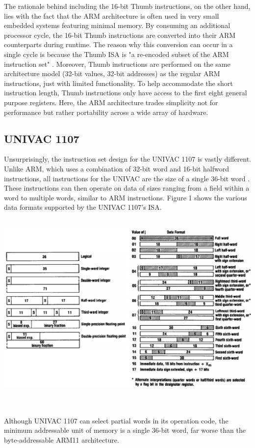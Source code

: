 \documentclass[onecolumn, draftclsnofoot, 10pt, compsoc]{IEEEtran}
\begin{document}
The rationale behind including the 16-bit Thumb instructions, on the other hand, lies with the fact that the ARM architecture is often used in very small embedded systems featuring minimal memory. By consuming an additional processor cycle, the 16-bit Thumb instructions are converted into their ARM counterparts during runtime. The reason why this conversion can occur in a single cycle is because the Thumb ISA is "a re-encoded subset of the ARM instruction set" \cite{armreference}. Moreover, Thumb instructions are performed on the same architecture model (32-bit values, 32-bit addresses) as the regular ARM instructions, just with limited functionality. To help accommodate the short instruction length, Thumb instructions only have access to the first eight general purpose registers. Here, the ARM architecture trades simplicity not for performance but rather portability across a wide array of hardware.
\subsection{UNIVAC 1107}
Unsurprisingly, the instruction set design for the UNIVAC 1107 is vastly different. Unlike ARM, which uses a combination of 32-bit word and 16-bit halfword instructions, all instructions for the UNIVAC are the size of a single 36-bit word \cite{univacarch}. These instructions can then operate on data of sizes ranging from a field within a word to multiple words, similar to ARM instructions. Figure 1 shows the various data formats supported by the UNIVAC 1107's ISA.\\ \\
\begin{minipage}{\linewidth}
\begin{center}
\includegraphics[width=\textwidth]{figure1.eps}
\end{center}
\end{minipage}
\\ \\ Although UNIVAC 1107 can select partial words in its operation code, the minimum addressable unit of memory is a single 36-bit word, far worse than the byte-addressable ARM11 architecture. 
\end{document}
